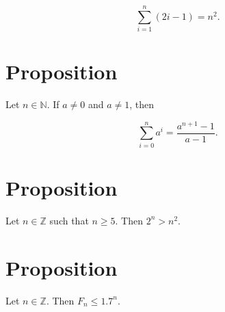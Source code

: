 \documentclass[12pt]{article}
\begin{document}
\[\sum_{i=1}^{n}{(2i-1)}=n^2.\]
\section*{Proposition}
Let $n\in\mathbb{N}$. If $a\neq 0$ and $a\neq 1$, then

\[\sum_{i=0}^{n}{a^i}=\frac{a^{n+1}-1}{a-1}.\]
\section*{Proposition}
Let $n\in\mathbb{Z}$ such that $n\geq 5$. Then $2^n>n^2$.
\section*{Proposition}
Let $n\in\mathbb{Z}$. Then $F_n\leq 1.7^n$.
\end{document}
